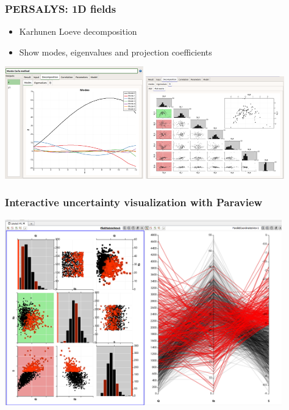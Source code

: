 \documentclass{beamer}
\begin{document}
\begin{frame}
\frametitle{PERSALYS: 1D fields}
	
\begin{itemize}
\item Karhunen Loeve decomposition
\item Show modes, eigenvalues and projection coefficients
\end{itemize}

\begin{center}
\includegraphics[width=0.45\textwidth]{figures/persalys-field-modes.png}
\includegraphics[width=0.45\textwidth]{figures/persalys-field-plotmatrix-extract.png}
\end{center}

\end{frame}

\begin{frame}
\frametitle{Interactive uncertainty visualization with Paraview}

\begin{center}
\includegraphics[width=0.9\textwidth]{figures/image032.png}
\end{center}

\end{frame}
\end{document}

